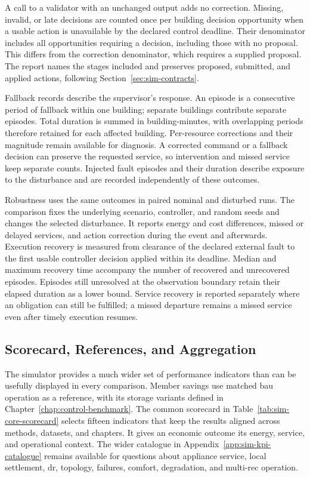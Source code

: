 A call to a validator with an unchanged output adds no correction. Missing, invalid, or late decisions are counted once per building decision opportunity when a usable action is unavailable by the declared control deadline. Their denominator includes all opportunities requiring a decision, including those with no proposal. This differs from the correction denominator, which requires a supplied proposal. The report names the stages included and preserves proposed, submitted, and applied actions, following Section~\ref{sec:sim-contracts}.

Fallback records describe the supervisor's response. An episode is a consecutive period of fallback within one building; separate buildings contribute separate episodes. Total duration is summed in building-minutes, with overlapping periods therefore retained for each affected building. Per-resource corrections and their magnitude remain available for diagnosis. A corrected command or a fallback decision can preserve the requested service, so intervention and missed service keep separate counts. Injected fault episodes and their duration describe exposure to the disturbance and are recorded independently of these outcomes.

Robustness uses the same outcomes in paired nominal and disturbed runs. The comparison fixes the underlying scenario, controller, and random seeds and changes the selected disturbance. It reports energy and cost differences, missed or delayed services, and action correction during the event and afterwards. Execution recovery is measured from clearance of the declared external fault to the first usable controller decision applied within its deadline. Median and maximum recovery time accompany the number of recovered and unrecovered episodes. Episodes still unresolved at the observation boundary retain their elapsed duration as a lower bound. Service recovery is reported separately where an obligation can still be fulfilled; a missed departure remains a missed service even after timely execution resumes.

\subsection{Scorecard, References, and Aggregation}
\label{sec:sim-scorecard-aggregation}

The simulator provides a much wider set of performance indicators than can be usefully displayed in every comparison. Member savings use matched \gls{bau} operation as a reference, with its storage variants defined in Chapter~\ref{chap:control-benchmark}. The common scorecard in Table~\ref{tab:sim-core-scorecard} selects fifteen indicators that keep the results aligned across methods, datasets, and chapters. It gives an economic outcome its energy, service, and operational context. The wider catalogue in Appendix~\ref{app:sim-kpi-catalogue} remains available for questions about appliance service, local settlement, \gls{dr}, topology, failures, comfort, degradation, and multi-\gls{rec} operation.

